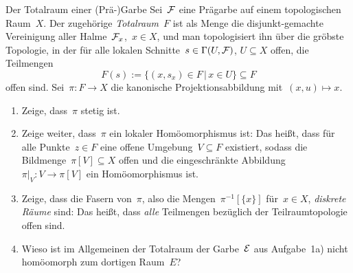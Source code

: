 \documentclass{uebblatt}
\begin{document}
\begin{aufgabe}{Der Totalraum einer (Prä-)Garbe}
Sei~$\mathcal{F}$ eine Prägarbe auf einem topologischen Raum~$X$. Der zugehörige
\emph{Totalraum}~$F$ ist als Menge die disjunkt-gemachte Vereinigung aller
Halme~$\mathcal{F}_x$,~$x \in X$, und man topologisiert ihn über die gröbste Topologie, in
der für alle lokalen Schnitte~$s \in \Gamma(U,\mathcal{F})$, $U \subseteq X$ offen, die
Teilmengen
\[ F(s) := \{ (x, s_x) \in F \,|\, x \in U \} \subseteq F \]
offen sind. Sei~$\pi : F \to X$ die kanonische Projektionsabbildung
mit~$(x,u) \mapsto x$.

\begin{enumerate}
\item Zeige, dass~$\pi$ stetig ist.
\item Zeige weiter, dass~$\pi$ ein lokaler Homöomorphismus ist: Das heißt, dass
für alle Punkte~$z \in F$ eine offene Umgebung~$V \subseteq F$ existiert,
sodass die Bildmenge~$\pi[V] \subseteq X$ offen und die eingeschränkte
Abbildung~$\pi|_V : V \to \pi[V]$ ein Homöomorphismus ist.
\item Zeige, dass die Fasern von~$\pi$, also die Mengen~$\pi^{-1}[\{x\}]$
für~$x \in X$, \emph{diskrete Räume} sind: Das heißt, dass \emph{alle}
Teilmengen bezüglich der Teilraumtopologie offen sind.
\item Wieso ist im Allgemeinen der Totalraum der Garbe~$\mathcal{E}$ aus Aufgabe~1a)
nicht homöomorph zum dortigen Raum~$E$?
\end{enumerate}
\end{aufgabe}

\newpage
\end{document}
